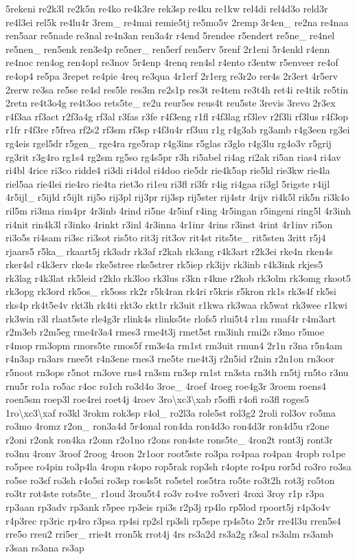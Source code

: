 {5rekeni re2k3l re2k5n re4ko re4k3re rek3sp re4ku re1kw rel4di rel4d3o reld3r re4l3ei rel5k re4lu4r 3rem\-\_\- re4mai remie5tj re5mo5v 2remp 3r4en\-\_\- re2na re4naa ren5aar re5nade re3nal re4n3an ren3a4r r4end 5rendee r5endert re5ne\-\_\- re4nel re5nen\-\_\- ren5enk ren3e4p re5ner\-\_\- ren5erf ren5erv 5renf 2r1eni 5r4enkl r4enn re4noc ren4og ren4opl re3nov 5r4enp 4renq ren4sl r4ento r3entw r5enveer re4of re4op4 re5pa 3repet re4pie 4req re3qua 4r1erf 2r1erg re3r2o rer4s 2r3ert 4r5erv 2rerw re3sa re5se re4sl res5le res3m re2s1p res3t re4tem re3t4h ret4i re4tik re5tin 2retn re4t3o4g re4t3oo rets5te\-\_\- re2u reur5es reus4t reu5ste 3revis 3revo 2r3ex r4f3aa rf3act r2f3a4g rf3al r3fas r3fe r4f3eng r1fl r4f3lag rf3lev r2f3li rf3lus r4f3op r1fr r4f3re r5frea rf2s2 rf3sm rf3sp r4f3u4r rf3uu r1g r4g3ab rg3amb r4g3een rg3ei rg4eis rgel5dr r5gen\-\_\- rge4ra rge5rap r4g3ins r5glas r3glo r4g3lu rg4o3v r5grij rg3rit r3g4ro rg1s4 rg2sm rg5so rg4s5pr r3h ri5abel ri4ag ri2ak ri5an rias4 ri4av ri4bl 4rice ri3co ridde4 ri3di ri4dol ri4doo rie5dr rie4k5ap rie5kl rie3kw rie4la riel5aa rie4lei rie4ro rie4ta riet3o ri1eu ri3fl ri3fr r4ig ri4gaa ri3gl 5rigste r4ijl 4r5ijl\-\_\- r5ijld r5ijlt rij5o rij3pl rij3pr rij3sp rij5ster rij4str 4rijv ri4k5l rik5n ri3k4o ril5m ri3ma rim4pr 4r3inb 4rind ri5ne 4r5inf r4ing 4r5ingan r5ingeni ring5l 4r3inh ri4nit rin4k3l r3inko 4rinkt r3inl 4r3inna 4r1inr 4rins r3inst 4rint 4r1inv ri5on ri3o5s ri4sam ri3sc ri3sot ris5to rit3j rit3ov rit4st rits5te\-\_\- rit5sten 3ritt r5j4 rjaars5 r5ka\-\_\- rkaart5j rk3adr rk3af r2kah rk3ang r4k3art r2k3ei rke4n rken4s rker4sl r4k3erv rke4s rke5stree rke5strer rk5iep rk3ijv rk3inb r4k3ink rkjes5 rk3lag r4k3lat rk5leid r2klo rk3loo rk3lus r3kn r4kne r2kob rk3olm rk3omg rkoot5 rk3opg rk3ord rk5os\-\_\- rk5oss rk2r r5k4ran rk4ri r5kris r5kron rk1s rk3s4f rk5si rks4p rk4t5e4v rkt3h rk4ti rkt3o rkt1r rk3uit r1kwa rk3waa rk5wat rk3wee r1kwi rk3win r3l rlaat5ste rle4g3r rlink4s rlinks5te rlofs5 rlui5t4 r1m rmaf4r r4m3art r2m3eb r2m5eg rme4r3a4 rmes3 rme4t3j rmet5st rm3inh rmi2s r3mo r5moe r4mop rm3opm rmors5te rmos5f rm3s4a rm1st rm3uit rmun4 2r1n r3na r5n4am r4n3ap rn3ars rnee5t r4n3ene rnes3 rne5te rne4t3j r2n5id r2nin r2n1on rn3oor r5noot rn3ops r5not rn3ove rns4 rn3sm rn3sp rn1st rn3sta rn3th rn5tj rn5to r3nu rnu5r ro1a ro5ac r4oc ro1ch ro3d4o 3roe\-\_\- 4roef 4roeg roe4g3r 3roem roens4 roen5sm roep3l roe4rei roet4j 4roev 3ro\textbackslash{}xc3\textbackslash{}xab r5offi r4ofi ro3fl roges5 1ro\textbackslash{}xc3\textbackslash{}xaf ro3kl 3rokm rok3sp r4ol\-\_\- ro2l3a role5st rol3g2 2roli rol3ov ro5ma ro3mo 4romz r2on\-\_\- ron3a4d 5r4onal ron4da ron4d3o ron4d3r ron4d5u r2one r2oni r2onk ron4ka r2onn r2o1no r2ons ron4ste rons5te\-\_\- 4ron2t ront3j ront3r ro3nu 4ronv 3roof 2roog 4roon 2r1oor root5ste ro3pa ro4paa ro4pan 4ropb ro1pe ro5pee ro4pin ro3p4la 4ropn r4opo rop5rak rop3sh r4opte ro4pu ror5d ro3ro ro3sa ro5se ro3sf ro3sh r4o5si ro3sp ros4s5t ro5stel ros5tra ro5te ro3t2h rot3j ro5ton ro3tr rot4ste rots5te\-\_\- r1oud 3rou5t4 ro3v ro4ve ro5veri 4roxi 3roy r1p r3pa rp3aan rp3adv rp3ank r5pee rp3eis rpi3s r2p3j rp4lo rp5lod rpoort5j r4p3o4v r4p3rec rp3ric rp4ro r3psa rp4si rp2sl rp3sli rp5spe rp4s5to 2r5r rre4l3u rren5s4 rre5o rreu2 rri5er\-\_\- rrie4t rron5k rrot4j 4rs rs3a2d rs3a2g r3sal rs3alm rs3amb r3san rs3ana rs3ap }
